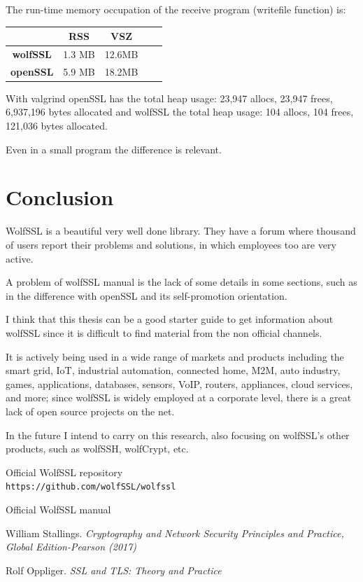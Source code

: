 \documentclass[a4paper,12pt]{article}
\begin{document}
The run-time memory occupation of the receive program (writefile function) is:
\\
\begin{tabular}{ ||c|c|c|c|c|| } 
 \hline
 & RSS & VSZ\\ 
 \hline
 \textbf{wolfSSL} &1.3 MB& 12.6MB\\ 
 \hline
 \textbf{openSSL} &5.9 MB& 18.2MB\\ 
 \hline
\end{tabular}
\newline
\newline
With valgrind openSSL has the total heap usage: 23,947 allocs, 23,947 frees, 6,937,196 bytes allocated and wolfSSL the total heap usage: 104 allocs, 104 frees, 121,036 bytes allocated.

Even in a small program the difference is relevant.
\section{Conclusion}
WolfSSL is a beautiful very well done library. They have a forum where thousand of users report their problems and solutions, in which employees too are very active.

A problem of wolfSSL manual is the lack of some details in some sections, such as in the difference with openSSL and its self-promotion orientation.

I think that this thesis can be a good starter guide to get information about wolfSSL since it is difficult to find material from the non official channels.

It is actively being used in a wide range of markets and products including the smart grid, IoT, industrial automation, connected home, M2M, auto industry, games, applications, databases, sensors, VoIP, routers, appliances, cloud services, and more; since wolfSSL is widely employed at a corporate level, there is a great lack of open source projects on the net.

In the future I intend to carry on this research, also focusing on wolfSSL's other products, such as wolfSSH, wolfCrypt, etc.



\begin{thebibliography}{9}

Official WolfSSL repository
\\\texttt{https://github.com/wolfSSL/wolfssl}

Official WolfSSL manual

William Stallings. \textit{ Cryptography and Network Security Principles and Practice, Global Edition-Pearson (2017)}

Rolf Oppliger. \textit{SSL and TLS: Theory and Practice}
\end{thebibliography}
\end{document}
